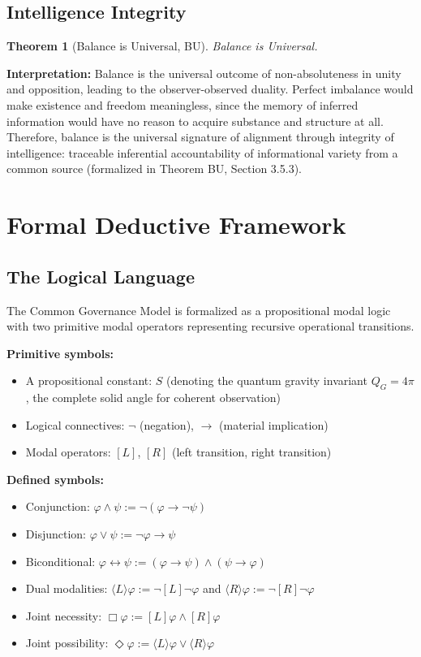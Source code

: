 \documentclass[11pt,a4paper]{article}
\newtheorem{theorem}{Theorem}
\theoremstyle{definition}
\theoremstyle{remark}
\begin{document}
\subsection{Intelligence Integrity}

\begin{theorem}[Balance is Universal, BU]
\textit{Balance is Universal.}
\end{theorem}

\noindent\textbf{Interpretation:} 
Balance is the universal outcome of non-absoluteness in unity and opposition, leading to the observer-observed duality. Perfect imbalance would make existence and freedom meaningless, since the memory of inferred information would have no reason to acquire substance and structure at all. Therefore, balance is the universal signature of alignment through integrity of intelligence: traceable inferential accountability of informational variety from a common source (formalized in Theorem BU, Section 3.5.3).

\section{Formal Deductive Framework}

\subsection{The Logical Language}

The Common Governance Model is formalized as a propositional modal logic with two primitive modal operators representing recursive operational transitions.

\textbf{Primitive symbols:}
\begin{itemize}
\item A propositional constant: $S$ (denoting the quantum gravity invariant $Q_G = 4\pi$, the complete solid angle for coherent observation)
\item Logical connectives: $\neg$ (negation), $\to$ (material implication)
\item Modal operators: $[L]$, $[R]$ (left transition, right transition)
\end{itemize}

\textbf{Defined symbols:}
\begin{itemize}
\item Conjunction: $\varphi \land \psi := \neg(\varphi \to \neg\psi)$
\item Disjunction: $\varphi \lor \psi := \neg\varphi \to \psi$
\item Biconditional: $\varphi \leftrightarrow \psi := (\varphi \to \psi) \land (\psi \to \varphi)$
\item Dual modalities: $\langle L\rangle\varphi := \neg[L]\neg\varphi$ and $\langle R\rangle\varphi := \neg[R]\neg\varphi$
\item Joint necessity: $\Box\varphi := [L]\varphi \land [R]\varphi$
\item Joint possibility: $\Diamond\varphi := \langle L\rangle\varphi \lor \langle R\rangle\varphi$
\end{itemize}
\end{document}
